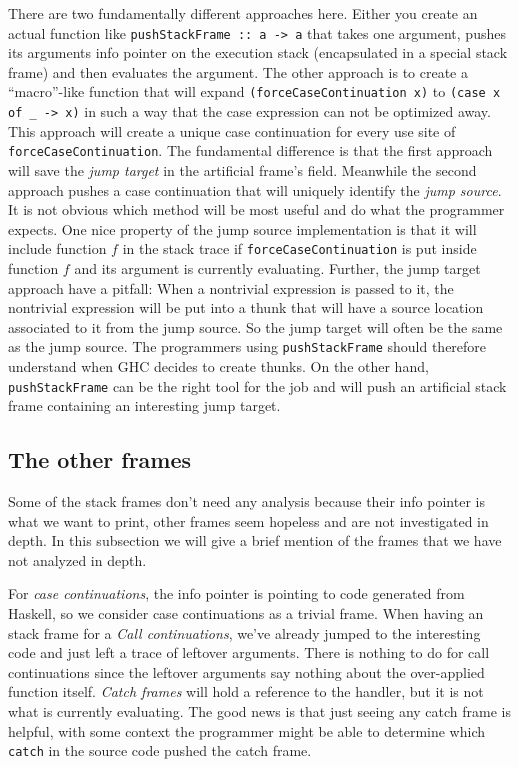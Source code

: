 There are two fundamentally different approaches here. Either you create
an actual function like \texttt{pushStackFrame :: a -> a} that takes
one argument, pushes its arguments info pointer on the execution stack
(encapsulated in a special stack frame) and then evaluates the argument.
The other approach is to create a ``macro''-like function that will
expand \texttt{(forceCaseContinuation x)} to \texttt{(case x of \_ ->
x)} in such a way that the case expression can not be optimized away.
This approach will create a unique case continuation for every use site
of \texttt{forceCaseContinuation}. The fundamental difference is that
the first approach will save the \emph{jump target} in the artificial
frame's field. Meanwhile the second approach pushes a case continuation
that will uniquely identify the \emph{jump source}. It is not obvious
which method will be most useful and do what the programmer expects. One
nice property of the jump source implementation is that it will include
function $f$ in the stack trace if \texttt{forceCaseContinuation} is
put inside function $f$ and its argument is currently evaluating.
Further, the jump target approach have a pitfall: When a nontrivial
expression is passed to it, the nontrivial expression will be put into
a thunk that will have a source location associated to it from the jump
source. So the jump target will often be the same as
the jump source. The programmers using \texttt{pushStackFrame} should
therefore understand when GHC decides to create thunks. On the other
hand, \texttt{pushStackFrame} can be the right tool for the job and will
push an artificial stack frame containing an interesting jump target.

\subsection{The other frames}

Some of the stack frames don't need any analysis because their info
pointer is what we want to print, other frames seem hopeless and are not
investigated in depth. In this subsection we will give a brief mention
of the frames that we have not analyzed in depth.

For \emph{case continuations}, the info pointer is pointing to code
generated from Haskell, so we consider case continuations as a
trivial frame. When having an stack frame for a \emph{Call continuations}, we've already
jumped to the interesting code and just left a trace of leftover arguments.
There is nothing to do for call continuations since the leftover arguments
say nothing about the over-applied function itself.
\emph{Catch frames} will hold a reference to the handler, but it is
not what is currently evaluating. The good news is that just seeing
any catch frame is helpful, with some context the programmer might be
able to determine which \texttt{catch} in the source code pushed the
catch frame.

